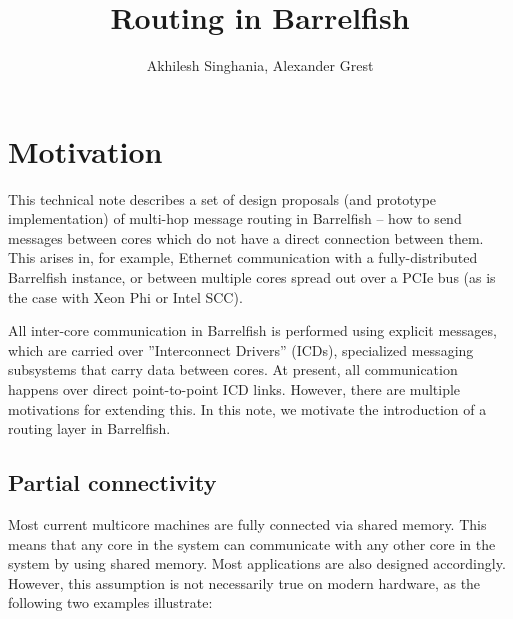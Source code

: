 \documentclass[a4paper,twoside]{report} %
\title{Routing in Barrelfish}   %
\author{Akhilesh Singhania, Alexander Grest}	%
\begin{document}
\maketitle

%
%
\begin{versionhistory}
\end{versionhistory}


\chapter{Motivation}

This technical note describes a set of design proposals (and prototype
implementation) of multi-hop message routing in Barrelfish -- how to
send messages between cores which do not have a direct connection
between them.  This arises in, for example, Ethernet communication
with a fully-distributed Barrelfish instance, or between multiple
cores spread out over a PCIe bus (as is the case with Xeon Phi or
Intel SCC). 

All inter-core communication in Barrelfish is performed using explicit
messages, which are carried over ''Interconnect Drivers'' (ICDs),
specialized messaging subsystems that carry data between cores. At
present, all communication happens over direct point-to-point ICD
links. However, there are multiple motivations for extending this. In
this note, we motivate the introduction of a routing layer in
Barrelfish. 


\section{Partial connectivity}
Most current multicore machines are fully connected via shared memory. This means that any core in the system can communicate with any other core in the system
by using shared memory. Most applications are also designed accordingly. However, this assumption is not necessarily true on modern hardware, as the following two examples illustrate:
\end{document}
